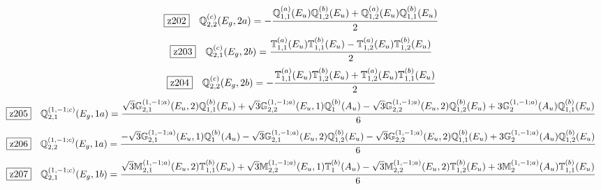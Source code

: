 \documentclass[fleqn,10pt,landscape]{jsarticle}
\begin{document}
\begin{dmath*}
\hspace*{3mm}\fbox{z202}\quad \mathbb{Q}_{2,2}^{(c)}(E_{g},2a)=- \frac{\mathbb{Q}_{1,1}^{(a)}(E_{u}) \mathbb{Q}_{1,2}^{(b)}(E_{u}) + \mathbb{Q}_{1,2}^{(a)}(E_{u}) \mathbb{Q}_{1,1}^{(b)}(E_{u})}{2}
\end{dmath*}
\begin{dmath*}
\hspace*{3mm}\fbox{z203}\quad \mathbb{Q}_{2,1}^{(c)}(E_{g},2b)=\frac{\mathbb{T}_{1,1}^{(a)}(E_{u}) \mathbb{T}_{1,1}^{(b)}(E_{u}) - \mathbb{T}_{1,2}^{(a)}(E_{u}) \mathbb{T}_{1,2}^{(b)}(E_{u})}{2}
\end{dmath*}
\begin{dmath*}
\hspace*{3mm}\fbox{z204}\quad \mathbb{Q}_{2,2}^{(c)}(E_{g},2b)=- \frac{\mathbb{T}_{1,1}^{(a)}(E_{u}) \mathbb{T}_{1,2}^{(b)}(E_{u}) + \mathbb{T}_{1,2}^{(a)}(E_{u}) \mathbb{T}_{1,1}^{(b)}(E_{u})}{2}
\end{dmath*}
\begin{dmath*}
\hspace*{3mm}\fbox{z205}\quad \mathbb{Q}_{2,1}^{(1,-1;c)}(E_{g},1a)=\frac{\sqrt{3} \mathbb{G}_{2,1}^{(1,-1;a)}(E_{u},2) \mathbb{Q}_{1,1}^{(b)}(E_{u}) + \sqrt{3} \mathbb{G}_{2,2}^{(1,-1;a)}(E_{u},1) \mathbb{Q}_{1}^{(b)}(A_{u}) - \sqrt{3} \mathbb{G}_{2,2}^{(1,-1;a)}(E_{u},2) \mathbb{Q}_{1,2}^{(b)}(E_{u}) + 3 \mathbb{G}_{2}^{(1,-1;a)}(A_{u}) \mathbb{Q}_{1,1}^{(b)}(E_{u})}{6}
\end{dmath*}
\begin{dmath*}
\hspace*{3mm}\fbox{z206}\quad \mathbb{Q}_{2,2}^{(1,-1;c)}(E_{g},1a)=\frac{- \sqrt{3} \mathbb{G}_{2,1}^{(1,-1;a)}(E_{u},1) \mathbb{Q}_{1}^{(b)}(A_{u}) - \sqrt{3} \mathbb{G}_{2,1}^{(1,-1;a)}(E_{u},2) \mathbb{Q}_{1,2}^{(b)}(E_{u}) - \sqrt{3} \mathbb{G}_{2,2}^{(1,-1;a)}(E_{u},2) \mathbb{Q}_{1,1}^{(b)}(E_{u}) + 3 \mathbb{G}_{2}^{(1,-1;a)}(A_{u}) \mathbb{Q}_{1,2}^{(b)}(E_{u})}{6}
\end{dmath*}
\begin{dmath*}
\hspace*{3mm}\fbox{z207}\quad \mathbb{Q}_{2,1}^{(1,-1;c)}(E_{g},1b)=\frac{\sqrt{3} \mathbb{M}_{2,1}^{(1,-1;a)}(E_{u},2) \mathbb{T}_{1,1}^{(b)}(E_{u}) + \sqrt{3} \mathbb{M}_{2,2}^{(1,-1;a)}(E_{u},1) \mathbb{T}_{1}^{(b)}(A_{u}) - \sqrt{3} \mathbb{M}_{2,2}^{(1,-1;a)}(E_{u},2) \mathbb{T}_{1,2}^{(b)}(E_{u}) + 3 \mathbb{M}_{2}^{(1,-1;a)}(A_{u}) \mathbb{T}_{1,1}^{(b)}(E_{u})}{6}
\end{dmath*}
\end{document}
